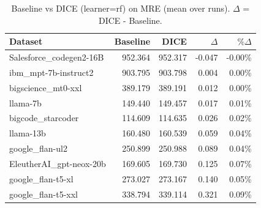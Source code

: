 \begin{table}[t]
\centering
\small
\caption{Baseline vs DICE (learner=rf) on MRE (mean over runs). $\Delta$ = DICE - Baseline.}
\label{tab:baseline-vs-dice-rf-light-MRE}
\begin{tabular}{lrrrr}
\toprule
Dataset & Baseline & DICE & $\Delta$ & $\%\Delta$ \\
\midrule
Salesforce\_codegen2-16B & 952.364 & 952.317 & -0.047 & -0.00\% \\
ibm\_mpt-7b-instruct2 & 903.795 & 903.798 & 0.004 & 0.00\% \\
bigscience\_mt0-xxl & 389.179 & 389.191 & 0.012 & 0.00\% \\
llama-7b & 149.440 & 149.457 & 0.017 & 0.01\% \\
bigcode\_starcoder & 114.609 & 114.635 & 0.026 & 0.02\% \\
llama-13b & 160.480 & 160.539 & 0.059 & 0.04\% \\
google\_flan-ul2 & 250.899 & 250.988 & 0.089 & 0.04\% \\
EleutherAI\_gpt-neox-20b & 169.605 & 169.730 & 0.125 & 0.07\% \\
google\_flan-t5-xl & 273.027 & 273.167 & 0.140 & 0.05\% \\
google\_flan-t5-xxl & 338.794 & 339.114 & 0.321 & 0.09\% \\
\bottomrule
\end{tabular}
\end{table}